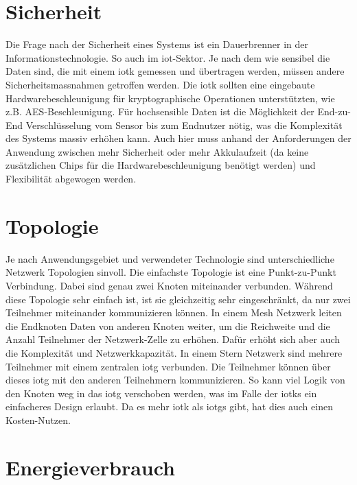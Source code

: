 \section{Sicherheit}

Die Frage nach der Sicherheit eines Systems ist ein Dauerbrenner in der Informationstechnologie. So auch im \acrshort{iot}-Sektor. Je nach dem wie sensibel die Daten sind, die mit einem \gls{iotk} gemessen und übertragen werden, müssen andere Sicherheitsmassnahmen getroffen werden. Die \gls{iotk} sollten eine eingebaute Hardwarebeschleunigung für kryptographische Operationen unterstützten, wie z.B. AES-Beschleunigung. Für hochsensible Daten ist die Möglichkeit der End-zu-End Verschlüsselung vom Sensor bis zum Endnutzer nötig, was die Komplexität des Systems massiv erhöhen kann. Auch hier muss anhand der Anforderungen der Anwendung zwischen mehr Sicherheit oder mehr Akkulaufzeit (da keine zusätzlichen Chips für die Hardwarebeschleunigung benötigt werden) und Flexibilität abgewogen werden.

\section{Topologie}

Je nach Anwendungsgebiet und verwendeter Technologie sind unterschiedliche Netzwerk Topologien sinvoll. Die einfachste Topologie ist eine Punkt-zu-Punkt Verbindung. Dabei sind genau zwei Knoten miteinander verbunden. Während diese Topologie sehr einfach ist, ist sie gleichzeitig sehr eingeschränkt, da nur zwei Teilnehmer miteinander kommunizieren können. In einem Mesh Netzwerk leiten die Endknoten Daten von anderen Knoten weiter, um die Reichweite und die Anzahl Teilnehmer der Netzwerk-Zelle zu erhöhen. Dafür erhöht sich aber auch die Komplexität und Netzwerkkapazität. In einem Stern Netzwerk sind mehrere Teilnehmer mit einem zentralen \gls{iotg} verbunden. Die Teilnehmer können über dieses \gls{iotg} mit den anderen Teilnehmern kommunizieren. So kann viel Logik von den Knoten weg in das \gls{iotg} verschoben werden, was im Falle der \glspl{iotk} ein einfacheres Design erlaubt. Da es mehr \gls{iotk} als \glspl{iotg} gibt, hat dies auch einen Kosten-Nutzen.

\section{Energieverbrauch}

